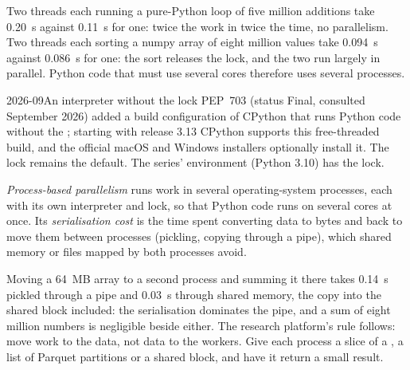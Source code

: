 Two threads each running a pure-Python loop of five million additions take 0.20~s against 0.11~s for one: twice the work in twice
the time, no parallelism. Two threads each sorting a numpy array of eight million values take 0.094~s against 0.086~s for one: the
sort releases the lock, and the two run largely in parallel. Python code that must use several cores therefore uses several processes.

\begin{dated}{2026-09}{An interpreter without the lock}\label{dat:pl:python-at-scale:freethreading}
PEP~703 (status Final, consulted September 2026) added a build configuration of CPython that runs Python code without the ; starting with release 3.13 CPython supports this free-threaded build, and the official macOS and Windows installers
optionally install it. The lock remains the default. The series' environment (Python 3.10) has the lock.
\end{dated}

\begin{definition}\label{def:pl:python-at-scale:processes}
\emph{Process-based parallelism} runs work in several operating-system processes, each with its own
interpreter and lock, so that Python code runs on several cores at once. Its \emph{serialisation cost} is
the time spent converting data to bytes and back to move them between processes (pickling, copying through a pipe), which shared
memory or files mapped by both processes avoid.
\end{definition}

Moving a 64~MB array to a second process and summing it there takes 0.14~s pickled through a pipe and 0.03~s through shared memory,
the copy into the shared block included: the serialisation dominates the pipe, and a sum of eight million numbers is negligible
beside either. The research platform's rule follows: move work to the data, not data to the workers. Give each process a slice of a
, a list of Parquet partitions or a shared block, and have it return a small result.


